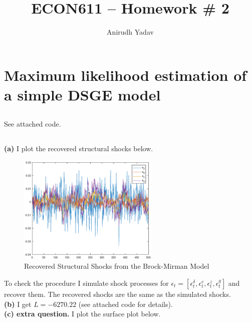 \documentclass[12pt]{article}
\title{ECON611 -- Homework \# 2}
\author{Anirudh Yadav}
\newcommand{\e}{\epsilon}
\begin{document}
\maketitle


\section{Maximum likelihood estimation of a simple DSGE model}

\subsection{} See attached code.

\subsection{}
\textbf{(a)} I plot the recovered structural shocks below.

\begin{figure}[h]
    \centering
        \includegraphics[width=0.6\textwidth]{shock_1.eps}
        \caption{Recovered Structural Shocks from the Brock-Mirman Model}
\end{figure}
To check the procedure I simulate shock processes for $\e_t = [\e_t^\delta, \e_t^c, \e_t^z, \e_t^g]$ and recover them. The recovered shocks are the same as the simulated shocks.\\

\textbf{(b)} I get $L =-6270.22$ (see attached code for details).\\

\textbf{(c) extra question.}
I plot the surface plot below.
\end{document}
